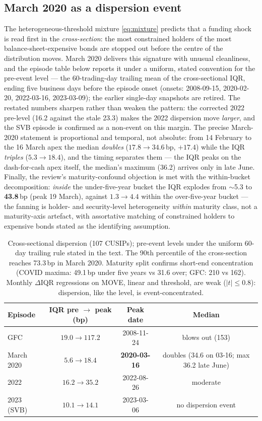 \documentclass[11pt]{article}
\begin{document}
\subsection{March 2020 as a dispersion event}\label{sec:disp}

The heterogeneous-threshold mixture \eqref{eq:mixture} predicts that a funding shock is read first in the \emph{cross-section}: the most constrained holders of the most balance-sheet-expensive bonds are stopped out before the centre of the distribution moves. March 2020 delivers this signature with unusual cleanliness, and the episode table below reports it under a uniform, stated convention for the pre-event level --- the 60-trading-day trailing mean of the cross-sectional IQR, ending five business days before the episode onset (onsets: 2008-09-15, 2020-02-20, 2022-03-16, 2023-03-09); the earlier single-day snapshots are retired. The restated numbers sharpen rather than weaken the pattern: the corrected 2022 pre-level (16.2 against the stale 23.3) makes the 2022 dispersion move \emph{larger}, and the SVB episode is confirmed as a non-event on this margin. The precise March-2020 statement is proportional and temporal, not absolute: from 14 February to the 16 March apex the median \emph{doubles} ($17.8\to34.6$\,bp, $+17.4$) while the IQR \emph{triples} ($5.3\to18.4$), and the timing separates them --- the IQR peaks on the dash-for-cash apex itself, the median's maximum (36.2) arrives only in late June. Finally, the review's maturity-confound objection is met with the within-bucket decomposition: \emph{inside} the under-five-year bucket the IQR explodes from $\sim$5.3 to \textbf{43.8}\,bp (peak 19 March), against $1.3\to4.4$ within the over-five-year bucket --- the fanning is holder- and security-level heterogeneity \emph{within} maturity class, not a maturity-axis artefact, with assortative matching of constrained holders to expensive bonds stated as the identifying assumption.

\begin{table}[h!]
\centering\small
\begin{tabular}{lccc}
\toprule
Episode & IQR pre $\to$ peak (bp) & Peak date & Median \\
\midrule
GFC & $19.0\to117.2$ & 2008-11-24 & blows out (153) \\
March 2020 & $5.6\to18.4$ & \textbf{2020-03-16} & doubles (34.6 on 03-16; max 36.2 late June) \\
2022 & $16.2\to35.2$ & 2022-08-26 & moderate \\
2023 (SVB) & $10.1\to14.1$ & 2023-03-06 & no dispersion event \\
\bottomrule
\end{tabular}
\caption{Cross-sectional dispersion (107 CUSIPs); pre-event levels under the uniform 60-day trailing rule stated in the text. The 90th percentile of the cross-section reaches 73.3\,bp in March 2020. Maturity split confirms short-end concentration (COVID maxima: 49.1\,bp under five years vs 31.6 over; GFC: 210 vs 162). Monthly $\Delta$IQR regressions on MOVE, linear and threshold, are weak ($|t|\le0.8$): dispersion, like the level, is event-concentrated.}
\end{table}
\end{document}
